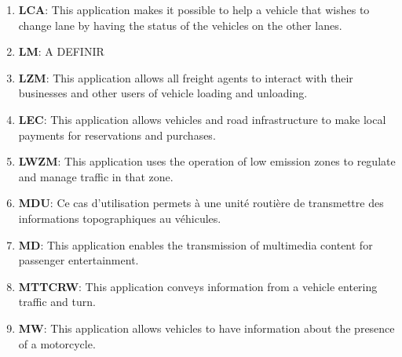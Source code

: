 \begin{enumerate}
\item \textbf{\acrfull{LCA}}: This application makes it possible to help a vehicle that wishes to change lane by having the status of the vehicles on the other lanes. \cite{etsi_etsi_tr_102_638_intelligent_2009,papadimitratos_vehicular_2009,brown_review_2019,boban_use_2017,al-sultan_comprehensive_2014,karagiannis_vehicular_2011,chang_intelligent_2010,cailean_survey_2014,zeadally_tutorial_2020,bila_vehicles_2017,noauthor_intelligent_nodate}
\item \textbf{\acrfull{LM}}: A DEFINIR \cite{dar_wireless_2010,noauthor_intelligent_nodate}
\item \textbf{\acrfull{LZM}}: This application allows all freight agents to interact with their businesses and other users of vehicle loading and unloading. \cite{etsi_etsi_tr_102_638_intelligent_2009}
\item \textbf{\acrfull{LEC}}: This application allows vehicles and road infrastructure to make local payments for reservations and purchases. \cite{etsi_etsi_tr_102_638_intelligent_2009}
\item \textbf{\acrfull{LWZM}}: This application uses the operation of low emission zones to regulate and manage traffic in that zone. \cite{noauthor_intelligent_nodate,chang_estimated_2015}
\item \textbf{\acrfull{MDU}}: Ce cas d'utilisation permets à une unité routière de transmettre des informations topographiques au véhicules. \cite{etsi_etsi_tr_102_638_intelligent_2009,papadimitratos_vehicular_2009,noauthor_perspectives_2016,hussain_autonomous_2019}
\item \textbf{\acrlong{MD}}: This application enables the transmission of multimedia content for passenger entertainment. \cite{etsi_etsi_tr_102_638_intelligent_2009,papadimitratos_vehicular_2009,etsi_tr_102_863_intelligent_2011,xu_dsrc_2017,noauthor_perspectives_2016,gerla_vehicular_2011}
\item \textbf{\acrfull{MTTCRW}}: This application conveys information from a vehicle entering traffic and turn. \cite{etsi_etsi_tr_102_638_intelligent_2009,j_vehicle--vehicle_2014,wu_evaluation_2018}
\item \textbf{\acrfull{MW}}: This application allows vehicles to have information about the presence of a motorcycle. \cite{etsi_etsi_tr_102_638_intelligent_2009,noauthor_applications_nodate-1}

\end{enumerate}
